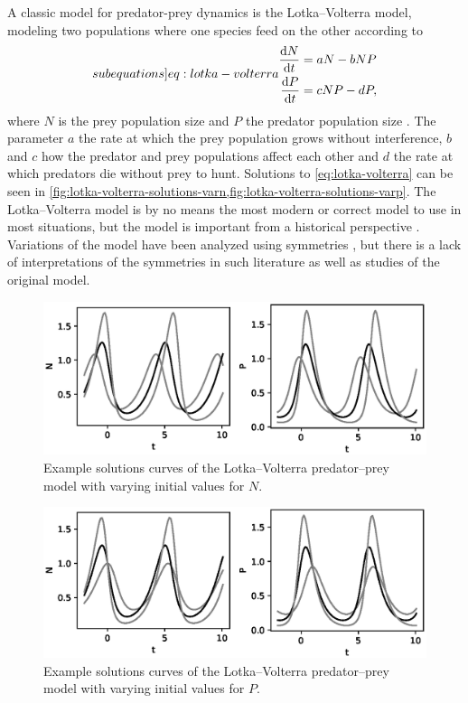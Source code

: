 A classic model for predator-prey dynamics is the Lotka--Volterra model, modeling two populations where one species feed on the other according to
\begin{subequations} \label[subequations]{eq:lotka-volterra}
  \begin{align}
    \diff{N}{t} &= a N - b N P\\
    \diff{P}{t} &= c N P - d P,
  \end{align}
\end{subequations}
where \(N\) is the prey population size and \(P\) the predator population size \cite{lotka1925elements,volterra1928variations}.
The parameter \(a\) the rate at which the prey population grows without interference, \(b\) and \(c\) how the predator and prey populations affect each other and \(d\) the rate at which predators die without prey to hunt.
Solutions to \cref{eq:lotka-volterra} can be seen in \cref{fig:lotka-volterra-solutions-varn,fig:lotka-volterra-solutions-varp}.
The Lotka--Volterra model is by no means the most modern or correct model to use in most situations, but the model is important from a historical perspective \cite{berryman1992orgins}.
Variations of the model have been analyzed using symmetries \cite{almeida1995lie,cherniha2004diffusive}, but there is a lack of interpretations of the symmetries in such literature as well as studies of the original model. %
\begin{figure}
  \centering
  \includegraphics[width=.96\textwidth]{images/lotka-volterra-solutions-varn}
  \caption{Example solutions curves of the Lotka--Volterra predator--prey model with varying initial values for \(N\).}
  \label{fig:lotka-volterra-solutions-varn}
\end{figure}
\begin{figure}
  \centering
  \includegraphics[width=.96\textwidth]{images/lotka-volterra-solutions-varp}
  \caption{Example solutions curves of the Lotka--Volterra predator--prey model with varying initial values for \(P\).}
  \label{fig:lotka-volterra-solutions-varp}
\end{figure}

